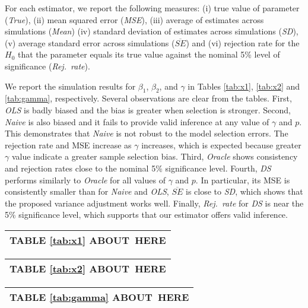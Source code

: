 \documentclass[11pt]{article}
\begin{document}
For each estimator, we report the following measures:
(i) true value of parameter (\emph{True}), (ii) mean squared error (\emph{MSE}),  (iii) average of estimates  across simulations (\emph{Mean}) (iv) standard deviation of estimates across simulations (\emph{SD}), (v) average standard
error across simulations ($\overline{SE}$) and (vi) rejection rate for the $H_0$ that the parameter equals its true value against the nominal 5\% level of significance (\emph{Rej.~rate}).

We report the %
simulation results for $\beta_1$, $\beta_2$, and $\gamma$ in Tables \ref{tab:x1}, \ref{tab:x2} and \ref{tab:gamma}, respectively. Several observations are clear from the tables. First, \emph{OLS} is badly biased and the bias is greater when selection is stronger. Second, \emph{Naive} is also biased and it fails to provide valid
inference at any value of $\gamma$ and $p$. This demonstrates that \emph{Naive} is not robust to the model selection errors. The rejection rate and MSE increase as $\gamma$ increases, which is expected
because greater $\gamma$ value indicate a greater sample selection bias. Third, \emph{Oracle} shows consistency and rejection rates close to the nominal 5\% significance level. Fourth, \emph{DS} performs similarly to \emph{Oracle} for all values of $\gamma$ and $p$. In
particular, its MSE is consistently smaller than for \emph{Naive} and \emph{OLS}, 
$\overline{SE}$ is close to \emph{SD}, which shows that the proposed variance adjustment works well. Finally, \emph{Rej.~rate} for \emph{DS} is near the 5\% significance level, which
supports that our estimator offers valid inference.


\begin{center}
\begin{tabular}
[c]{l}\hline\hline
TABLE \ref{tab:x1} ABOUT\ HERE\\\hline\hline
\end{tabular}
\end{center} 

\begin{center}
\begin{tabular}
[c]{l}\hline\hline
TABLE \ref{tab:x2}  ABOUT\ HERE\\\hline\hline
\end{tabular}
\end{center} 

\begin{center}
\begin{tabular}
[c]{l}\hline\hline
TABLE \ref{tab:gamma}  ABOUT\ HERE\\\hline\hline
\end{tabular}
\end{center} 
\end{document}
